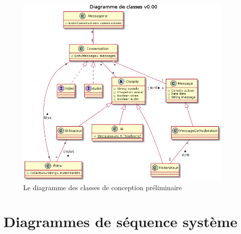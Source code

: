 \documentclass[11pt,dvipsnames,svgnames]{report}
\begin{document}
\begin{figure}[H]
\centerline{\includegraphics[width=0.95\textwidth]{diagrammes/class-diag.png}}
\caption{Le diagramme des classes de conception préliminaire}
\end{figure}

\section{Diagrammes de séquence système}
\end{document}
